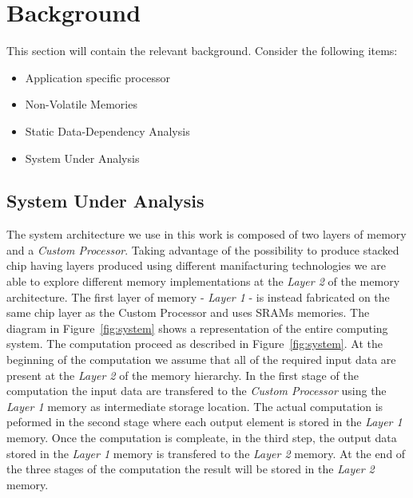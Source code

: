 \section{Background}
This section will contain the relevant background. Consider the following items:
\begin{itemize}
\item Application specific processor
\item Non-Volatile Memories
\item Static Data-Dependency Analysis
\item System Under Analysis
\end{itemize}

\subsection{System Under Analysis}
\label{ssec:system_under_analysis}
The system architecture we use in this work is composed of two layers of memory and a \textit{Custom Processor}. Taking advantage of the possibility to produce stacked chip having layers produced using different manifacturing technologies we are able to explore different memory implementations at the \textit{Layer 2} of the memory architecture. The first layer of memory - \textit{Layer 1} - is instead fabricated on the same chip layer as the Custom Processor and uses SRAMs memories. The diagram in Figure~\ref{fig:system} shows a representation of the entire computing system.
The computation proceed as described in Figure~\ref{fig:system}. At the beginning of the computation we assume that all of the required input data are present at the \textit{Layer 2} of the memory hierarchy. In the first stage of the computation the input data are transfered to the \textit{Custom Processor} using the \textit{Layer 1} memory as intermediate storage location. The actual computation is peformed in the second stage where each output element is stored in the \textit{Layer 1} memory. Once the computation is compleate, in the third step, the output data stored in the \textit{Layer 1} memory is transfered to the \textit{Layer 2} memory. At the end of the three stages of the computation the result will be stored in the \textit{Layer 2} memory.

